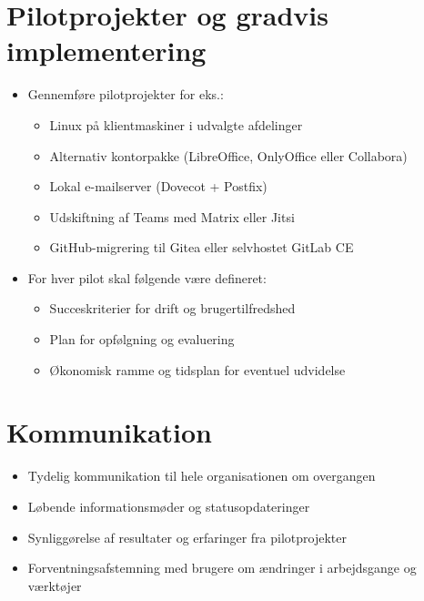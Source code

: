 \documentclass[a4paper,11pt,oneside]{book}
\def\tightlist{}
\begin{document}
\section{Pilotprojekter og gradvis
implementering}\label{pilotprojekter-og-gradvis-implementering}

\begin{itemize}
\item
  Gennemføre pilotprojekter for eks.:

  \begin{itemize}
  \tightlist
  \item
    Linux på klientmaskiner i udvalgte afdelinger
  \item
    Alternativ kontorpakke (LibreOffice, OnlyOffice eller Collabora)
  \item
    Lokal e-mailserver (Dovecot + Postfix)
  \item
    Udskiftning af Teams med Matrix eller Jitsi
  \item
    GitHub-migrering til Gitea eller selvhostet GitLab CE
  \end{itemize}
\item
  For hver pilot skal følgende være defineret:

  \begin{itemize}
  \tightlist
  \item
    Succeskriterier for drift og brugertilfredshed
  \item
    Plan for opfølgning og evaluering
  \item
    Økonomisk ramme og tidsplan for eventuel udvidelse
  \end{itemize}
\end{itemize}

\section{Kommunikation}\label{kommunikation}

\begin{itemize}
\tightlist
\item
  Tydelig kommunikation til hele organisationen om overgangen
\item
  Løbende informationsmøder og statusopdateringer
\item
  Synliggørelse af resultater og erfaringer fra pilotprojekter
\item
  Forventningsafstemning med brugere om ændringer i arbejdsgange og
  værktøjer
\end{itemize}
\end{document}
